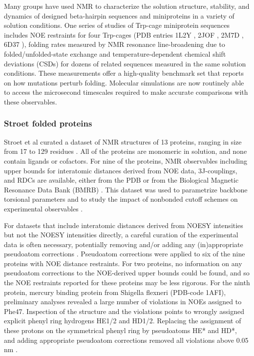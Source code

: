 \documentclass[9pt,review]{livecoms}
\begin{document}
Many groups have used NMR to characterize the solution structure, stability, and dynamics of designed beta-hairpin sequences and miniproteins in a variety of solution conditions.
One series of studies of Trp-cage miniprotein sequences \cite{neidigh_designing_2002,barua_trp-cage_2008,byrne_circular_2013,graham_reversing_2019} includes NOE restraints for four Trp-cages (PDB entries 1L2Y \cite{neidigh_designing_2002}, 2JOF \cite{barua_trp-cage_2008}, 2M7D \cite{byrne_circular_2013}, 6D37 \cite{graham_reversing_2019}), folding rates measured by NMR resonance line-broadening due to folded/unfolded-state exchange and temperature-dependent chemical shift deviations (CSDs) for dozens of related sequences measured in the same solution conditions.
These measurements offer a high-quality benchmark set that reports on how mutations perturb folding.
Molecular simulations are now routinely able to access the microsecond timescales required to make accurate comparisons with these observables.

\subsubsection{Stroet folded proteins}
\label{sub2:stroet}

Stroet et al curated a dataset of NMR structures of 13 proteins, ranging in size from 17 to 129 residues \cite{stroet_validation_2024}.
All of the proteins are monomeric in solution, and none contain ligands or cofactors.
For nine of the proteins, NMR observables including upper bounds for interatomic distances derived from NOE data, 3J-couplings, and RDCs are available, either from the PDB or from the Biological Magnetic Resonance Data Bank (BMRB) \cite{ulrich_biomagresbank_2008,romero_biomagresbank_2020}.
This dataset was used to parametrize backbone torsional parameters \cite{diem_hamiltonian_2020} and to study the impact of nonbonded cutoff schemes on experimental observables \cite{diem_effect_2020}.

For datasets that include interatomic distances derived from NOESY intensities but not the NOESY intensities directly, a careful curation of the experimental data is often necessary, potentially removing and/or adding any (in)appropriate pseudoatom corrections \cite{wuthrich_nmr_1986}.
Pseudoatom corrections were applied to six of the nine proteins with NOE distance restraints.
For two proteins, no information on any pseudoatom corrections to the NOE-derived upper bounds could be found, and so the NOE restraints reported for these proteins may be less rigorous.
For the ninth protein, mercury binding protein from Shigella flexneri (PDB-code 1AFI), preliminary analyses revealed a large number of violations in NOEs assigned to Phe47.
Inspection of the structure and the violations points to wrongly assigned explicit phenyl ring hydrogens HE1/2 and HD1/2.
Replacing the assignment of these protons on the symmetrical phenyl ring by pseudoatoms HE* and HD*, and adding appropriate pseudoatom corrections \cite{wuthrich_nmr_1986} removed all violations above 0.05 nm \cite{stroet_validation_2024}.
\end{document}

